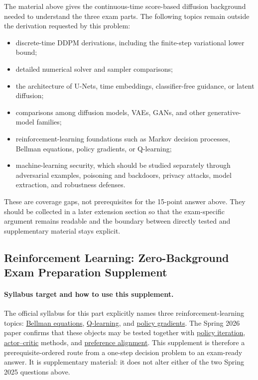 \documentclass[11pt,a4paper]{article}
\newcommand{\jump}[2]{\hyperref[#1]{#2}}
\theoremstyle{definition}
\begin{document}
The material above gives the continuous-time score-based diffusion background needed to
understand the three exam parts. The following topics remain outside the derivation
requested by this problem:

\begin{itemize}
    \item discrete-time DDPM derivations, including the finite-step variational lower bound;
    \item detailed numerical solver and sampler comparisons;
    \item the architecture of U-Nets, time embeddings, classifier-free guidance, or latent diffusion;
    \item comparisons among diffusion models, VAEs, GANs, and other generative-model families;
    \item reinforcement-learning foundations such as Markov decision processes, Bellman equations, policy gradients, or Q-learning;
    \item machine-learning security, which should be studied separately through adversarial examples, poisoning and backdoors, privacy attacks, model extraction, and robustness defenses.
\end{itemize}

These are coverage gaps, not prerequisites for the 15-point answer above. They should be collected in a later extension section so that the exam-specific argument remains readable and the boundary between directly tested and supplementary material stays explicit.



\subsection{Reinforcement Learning: Zero-Background Exam Preparation Supplement}
\label{sec:rl-supplement}

\paragraph{Syllabus target and how to use this supplement.}
The official syllabus for this part explicitly names three reinforcement-learning topics:
\jump{unit:1}{Bellman equations}, \jump{unit:2}{Q-learning}, and
\jump{unit:3}{policy gradients}. The Spring 2026 paper confirms that
these objects may be tested together with \jump{unit:1}{policy iteration},
\jump{def:actor-critic}{actor--critic} methods, and
\jump{unit:4}{preference alignment}. This supplement is therefore a prerequisite-ordered route from a
one-step decision problem to an exam-ready answer. It is supplementary material: it does
not alter either of the two Spring 2025 questions above.
\end{document}
